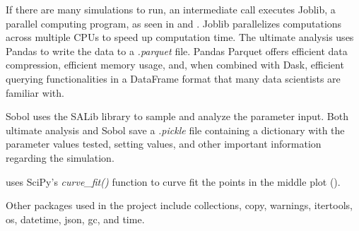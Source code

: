 If there are many simulations to run, an intermediate call executes Joblib, a parallel computing program, as seen in  and . 
Joblib parallelizes computations across multiple CPUs to speed up computation time. 
The ultimate analysis uses Pandas to write the data to a \textit{.parquet} file. 
Pandas Parquet offers efficient data compression, efficient memory usage, and, when combined with Dask, efficient querying functionalities in a DataFrame format that many data scientists are familiar with. 

Sobol uses the SALib library to sample and analyze the parameter input. 
Both ultimate analysis and Sobol save a \textit{.pickle} file containing a dictionary with the parameter values tested, setting values, and other important information regarding the simulation. 

 uses SciPy's \textit{curve\_fit()} function to curve fit the points in the middle plot (). 

Other packages used in the project include collections, copy, warnings, itertools, os, datetime, json, gc, and time. 